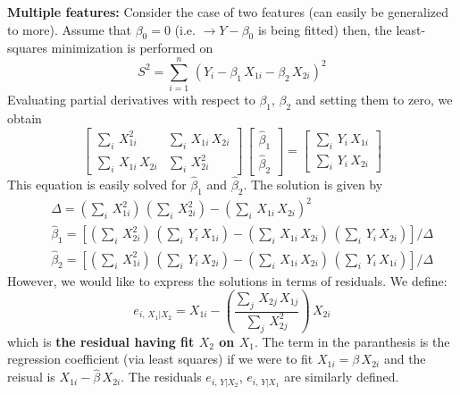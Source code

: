 \documentclass[aps,prl,preprint,superscriptaddress]{revtex4-1}
\begin{document}
\vspace{0.5cm}

{\bf Multiple features:} Consider the case of two features (can easily be generalized to more). Assume that $\beta_0=0$ (i.e.
$\rightarrow Y - \beta_0$ is being fitted) then, the least-squares minimization is performed on
%
\begin{equation}
S^2 = \sum_{i=1}^n\, \left( Y_i - \beta_1\, X_{1i} - \beta_2\, X_{2i} \right)^2
\end{equation}
%
Evaluating partial derivatives with respect to $\beta_1$, $\beta_2$ and setting them to zero, we obtain
%
\begin{equation}
\left[ \begin{array}{cc} 
    \sum_i\, X_{1i}^2 & \sum_i\, X_{1i}\, X_{2i} \\
    \sum_i\, X_{1i}\, X_{2i} & \sum_i\, X_{2i}^2 
       \end{array}
\right]\, 
\left[ \begin{array}{c}
    {\hat \beta}_1 \\ {\hat \beta}_2
       \end{array}
\right] = 
\left[ \begin{array}{c}
    \sum_i\, Y_i\, X_{1i} \\ \sum_i\, Y_i\, X_{2i}
       \end{array}
\right]
\end{equation}
%
This equation is easily solved for ${\hat \beta}_1$ and ${\hat \beta}_2$. 
The solution is given by
%
\begin{eqnarray}
&& \Delta = \left( \sum_i\, X_{1i}^2 \right)\, \left( \sum_i\, X_{2i}^2 \right) - \left( \sum_i\, X_{1i}\, X_{2i} \right)^2 \nonumber\\
&& {\hat \beta}_1 = \left[ \left( \sum_i\, X_{2i}^2 \right)\, \left( \sum_i\, Y_i\, X_{1i} \right) - 
			   \left( \sum_i\, X_{1i}\, X_{2i} \right)\, \left( \sum_i\, Y_i\, X_{2i} \right) \right] / \Delta \nonumber\\
%
&& {\hat \beta}_2 = \left[ \left( \sum_i\, X_{1i}^2 \right)\, \left( \sum_i\, Y_i\, X_{2i} \right) - 
			   \left( \sum_i\, X_{1i}\, X_{2i} \right)\, \left( \sum_i\, Y_i\, X_{1i} \right) \right] / \Delta 
\end{eqnarray}
%
However, we would like to
express the solutions in terms of residuals. We define:
%
\begin{equation}
e_{i,\, X_1 \vert X_2} = X_{1i} - \left( \frac{\sum_j\, X_{2j}\, X_{1j} } {\sum_j\, X_{2j}^2 } \right)\, X_{2i}
\end{equation}
% 
which is {\bf the residual having fit $X_2$ on $X_1$}. The term in the paranthesis is the regression coefficient (via least squares)
if we were to fit $X_{1i} = \beta\, X_{2i}$ and the reisual is $X_{1i} - {\hat \beta}\, X_{2i}$.
The residuals $e_{i, \, Y \vert X_2}$, $e_{i, \, Y \vert X_1}$ are similarly defined.
\end{document}
